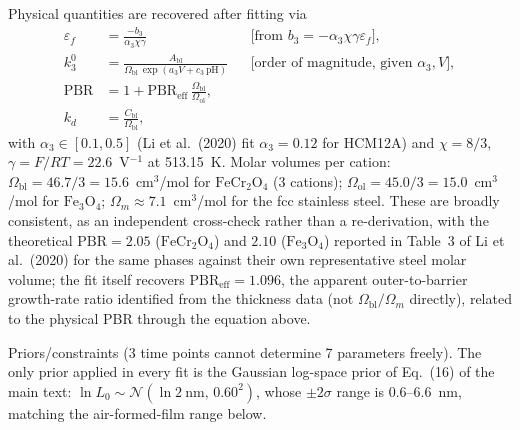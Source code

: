 Physical quantities are recovered after fitting via
\begin{align}
\varepsilon_f &= \frac{-b_3}{\alpha_3 \chi \gamma}
&&\text{[from } b_3 = -\alpha_3 \chi \gamma \varepsilon_f \text{]} , \\
k_3^{0} &= \frac{A_{\mathrm{bl}}}{\Omega_{\mathrm{bl}}\, \exp(a_3 V + c_3\,\mathrm{pH})}
&&\text{[order of magnitude, given } \alpha_3, V \text{]} , \\
\mathrm{PBR} &= 1 + \mathrm{PBR}_{\mathrm{eff}}\,
\frac{\Omega_{\mathrm{bl}}}{\Omega_{\mathrm{ol}}} , \\
k_d &= \frac{C_{\mathrm{bl}}}{\Omega_{\mathrm{bl}}} ,
\end{align}
with $\alpha_3 \in [0.1, 0.5]$ (Li et al.\ (2020) fit $\alpha_3 = 0.12$ for
HCM12A) and $\chi = 8/3$, $\gamma = F/RT = 22.6$~V$^{-1}$ at 513.15~K. Molar
volumes per cation:
$\Omega_{\mathrm{bl}} = 46.7/3 = 15.6$~cm$^3$/mol for $\mathrm{FeCr_2O_4}$
(3 cations);
$\Omega_{\mathrm{ol}} = 45.0/3 = 15.0$~cm$^3$/mol for $\mathrm{Fe_3O_4}$;
$\Omega_m \approx 7.1$~cm$^3$/mol for the fcc stainless steel. These are
broadly consistent, as an independent cross-check rather than a
re-derivation, with the theoretical $\mathrm{PBR} = 2.05$
($\mathrm{FeCr_2O_4}$) and $2.10$ ($\mathrm{Fe_3O_4}$) reported in
Table~3 of Li et al.\ (2020) for the same phases against their own
representative steel molar volume; the fit itself recovers
$\mathrm{PBR}_{\mathrm{eff}} = 1.096$, the apparent
outer-to-barrier growth-rate ratio identified from the thickness data
(not $\Omega_{\mathrm{bl}}/\Omega_m$ directly), related to the physical
PBR through the equation above.

Priors/constraints (3 time points cannot determine 7 parameters freely).
The only prior applied in every fit is the Gaussian log-space prior of
Eq.~(16) of the main text: $\ln L_0 \sim
\mathcal{N}(\ln 2~\mathrm{nm},\, 0.60^2)$, whose $\pm2\sigma$ range is
0.6--6.6~nm, matching the air-formed-film range below.

